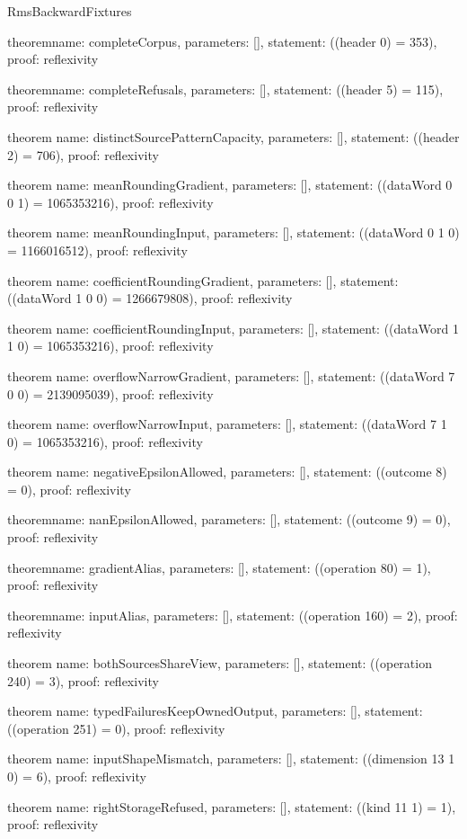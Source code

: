\begin{lexlean}{RmsBackwardFixtures}
\begin{semanticmodule}
theorem{name: completeCorpus, parameters: [], statement: ((header 0) = 353), proof: reflexivity{}}

theorem{name: completeRefusals, parameters: [], statement: ((header 5) = 115), proof: reflexivity{}}

theorem{
  name: distinctSourcePatternCapacity,
  parameters: [],
  statement: ((header 2) = 706),
  proof: reflexivity{}
}

theorem{
  name: meanRoundingGradient,
  parameters: [],
  statement: ((dataWord 0 0 1) = 1065353216),
  proof: reflexivity{}
}

theorem{
  name: meanRoundingInput,
  parameters: [],
  statement: ((dataWord 0 1 0) = 1166016512),
  proof: reflexivity{}
}

theorem{
  name: coefficientRoundingGradient,
  parameters: [],
  statement: ((dataWord 1 0 0) = 1266679808),
  proof: reflexivity{}
}

theorem{
  name: coefficientRoundingInput,
  parameters: [],
  statement: ((dataWord 1 1 0) = 1065353216),
  proof: reflexivity{}
}

theorem{
  name: overflowNarrowGradient,
  parameters: [],
  statement: ((dataWord 7 0 0) = 2139095039),
  proof: reflexivity{}
}

theorem{
  name: overflowNarrowInput,
  parameters: [],
  statement: ((dataWord 7 1 0) = 1065353216),
  proof: reflexivity{}
}

theorem{
  name: negativeEpsilonAllowed,
  parameters: [],
  statement: ((outcome 8) = 0),
  proof: reflexivity{}
}

theorem{name: nanEpsilonAllowed, parameters: [], statement: ((outcome 9) = 0), proof: reflexivity{}}

theorem{name: gradientAlias, parameters: [], statement: ((operation 80) = 1), proof: reflexivity{}}

theorem{name: inputAlias, parameters: [], statement: ((operation 160) = 2), proof: reflexivity{}}

theorem{
  name: bothSourcesShareView,
  parameters: [],
  statement: ((operation 240) = 3),
  proof: reflexivity{}
}

theorem{
  name: typedFailuresKeepOwnedOutput,
  parameters: [],
  statement: ((operation 251) = 0),
  proof: reflexivity{}
}

theorem{
  name: inputShapeMismatch,
  parameters: [],
  statement: ((dimension 13 1 0) = 6),
  proof: reflexivity{}
}

theorem{
  name: rightStorageRefused,
  parameters: [],
  statement: ((kind 11 1) = 1),
  proof: reflexivity{}
}


\end{semanticmodule}
\end{lexlean}
